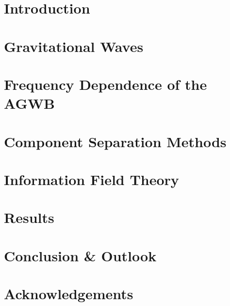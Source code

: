 \documentclass[twoside, 12pt, openany]{book}
\let\chaptername\relax
\begin{document}
\newpage
\begin{spacing}{1}
\tableofcontents
{}
\end{spacing}
\newpage

\pagestyle{fancy}
\renewcommand{\chaptermark}[1]{\markboth{#1}{#1}}
\fancyhead[R]{}
\fancyhead[L]{\MakeUppercase{\chaptername\ \thechapter\ --\ \leftmark} \newline
                \vspace{-0.7cm}
                \noindent\rule{\linewidth}{0.4pt}}
\chapter{Introduction}


\chapter{Gravitational Waves}
\label{gw_chapter}


\chapter{Frequency Dependence of the AGWB}
\label{frequency_chapter}


\chapter{Component Separation Methods}
\label{comp_sep}


\chapter{Information Field Theory}
\label{ift_chapter}


\chapter{Results}
\label{results_chapter}


\chapter{Conclusion \& Outlook}
\label{conclusion_chapter}


\appendix


\chapter*{Acknowledgements}



\newpage
{}
\printbibliography
\end{document}
